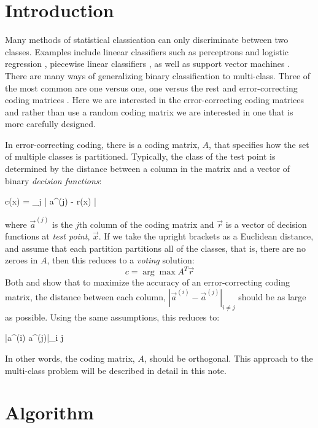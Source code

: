 
\section{Introduction}

Many methods of statistical classication can only discriminate between two classes. 
Examples include lineear classifiers such as perceptrons and logistic regression \citep{Michie_etal1994}, 
piecewise linear classifiers \citep{Herman_Yeung1992,Mills2011},
as well as support vector machines \citep{kernel_intro}.
There are many ways of generalizing binary classification to 
multi-class.
Three of the most common are one versus one, one versus the rest and 
error-correcting coding matrices \citep{Hsu_Lin2002}.
Here we are interested in the error-correcting coding matrices
\citep{Dietterich_Bakiri1995, Windeatt_Ghaderi2002} and
rather than use a random coding matrix we are interested in one that is
more carefully designed.

In error-correcting coding, there is a coding matrix, $A$, that specifies
how the set of multiple classes is partitioned.
Typically, the class of the test point is determined by the distance between
a column in the matrix and a vector of binary {\it decision functions}:
\begin{eqnnon}
	c(\vec x) = \arg \min_j | \vec a^{(j)} - \vec r(\vec x) |
	\label{min_dist}
\end{eqnnon}
where $\vec a^{(j)}$ is the $j$th column of the coding matrix and $\vec r$
is a vector of decision functions at {\it test point}, $\vec x$.
If we take the upright brackets as a Euclidean distance, and assume that
each partition partitions all of the classes, that is, there are no zeroes
in $A$, then this reduces to a {\it voting} solution:
\begin{equation}
	c = \arg \max A^T \vec r \label{voting}
\end{equation}
Both \citet{Allwein_etal2000} and \citet{Windeatt_Ghaderi2002} show that to
maximize the accuracy of an error-correcting coding matrix, the distance
between each column, $|\vec a^{(i)} - \vec a^{(j)}|_{i \ne j}$ should be as
large as possible.
Using the same assumptions, this reduces to:
\begin{eqnnon}
	\min |\vec a^{(i)} \cdot a^{(j)}|_{i \ne j}
\end{eqnnon}
In other words, the coding matrix, $A$, should be orthogonal.
This approach to the multi-class problem will be described in detail in this note.

\section{Algorithm}

